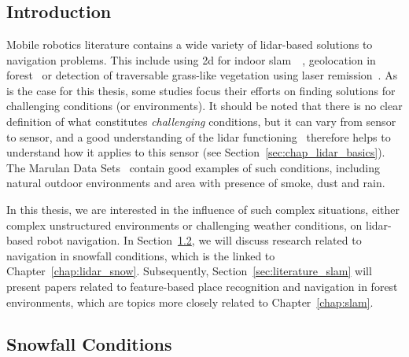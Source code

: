 \chapter{\chapzerotitle}
\label{chap:literature_review}


\section{Introduction}

Mobile robotics literature contains a wide variety of \gls*{lidar}-based solutions to navigation problems. This include using \gls*{2d} for indoor \gls*{slam}~\citep{Grisetti2007}~\citep{Kohlbrecher2011}, geolocation in forest~\citep{Hussein2015} or detection of traversable grass-like vegetation using laser remission~\citep{Wurm2009}. As is the case for this thesis, some studies focus their efforts on finding solutions for challenging conditions (or environments). It should be noted that there is no clear definition of what constitutes \emph{challenging} conditions, but it can vary from sensor to sensor, and a good understanding of the \gls*{lidar} functioning~\citep{Bosch2001} therefore helps to understand how it applies to this sensor (see Section~\ref{sec:chap_lidar_basics}). The Marulan Data Sets~\citep{Peynot2010} contain good examples of such conditions, including natural outdoor environments and area with presence of smoke, dust and rain.

In this thesis, we are interested in the influence of such complex situations, either complex unstructured environments or challenging weather conditions, on \gls*{lidar}-based robot navigation. In Section~\ref{sec:literature_snow}, we will discuss research related to navigation in snowfall conditions, which is the linked to Chapter~\ref{chap:lidar_snow}. Subsequently, Section~\ref{sec:literature_slam} will present papers related to feature-based place recognition and navigation in forest environments, which are topics more closely related to Chapter~\ref{chap:slam}. 


\section{Snowfall Conditions}
\label{sec:literature_snow}

